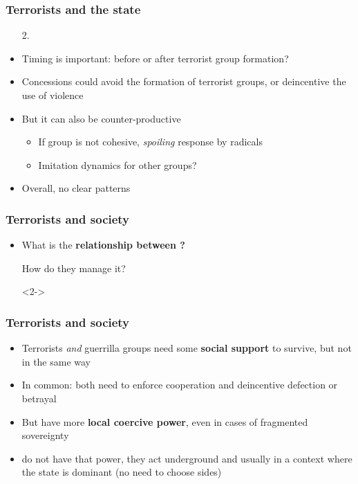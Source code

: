 \documentclass[aspectratio=43]{beamer}
\begin{document}
\begin{frame}
\frametitle{Terrorists and the state}
\centering

\begin{itemize}
  \item[2.] {}
  \item<2-> Timing is important: before or after terrorist group formation?
  \item<3-> Concessions could avoid the formation of terrorist groups, or deincentive the use of violence
  \item<4-> But it can also be counter-productive
  \begin{itemize}
    \item If group is not cohesive, \textit{spoiling} response by radicals
    \item Imitation dynamics for other groups?
  \end{itemize}
  \item<5-> Overall, no clear patterns
\end{itemize}

\end{frame}

\begin{frame}
\frametitle{Terrorists and society}
\centering

\begin{itemize}[<+->]
  \item What is the \textbf{relationship between {\color{red}{terrorists and civilians}}?}
  \item[] How do they manage it?
  \item[]<2-> {\color{white}{And how are they influenced by it?}}
\end{itemize}

\end{frame}

\begin{frame}
\frametitle{Terrorists and society}
\centering

\begin{itemize}[<+->]
  \item Terrorists \textit{and} guerrilla groups need some \textbf{social support} to survive, but not in the same way
  \item In common: both need to enforce cooperation and deincentive defection or betrayal
  \item But {} have more \textbf{local coercive power}, even in cases of fragmented sovereignty
  \item {} do not have that power, they act underground and usually in a context where the state is dominant (no need to choose sides)
\end{itemize}

\end{frame}
\end{document}
